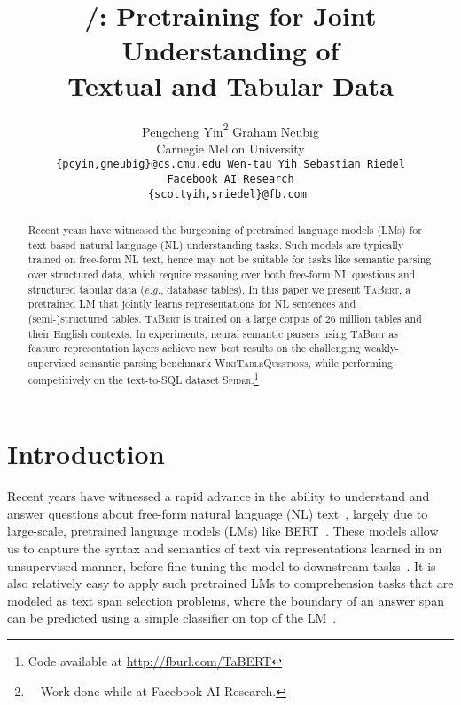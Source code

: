 \documentclass[11pt,a4paper]{article}
\title{\model/: Pretraining for Joint Understanding of \\Textual and Tabular Data}
\author{
	Pengcheng Yin\thanks{~~Work done while at Facebook AI Research.} \quad Graham Neubig \\ 
	Carnegie Mellon University \\
	\tt{\{pcyin,gneubig\}@cs.cmu.edu}
	\And Wen-tau Yih \quad Sebastian Riedel \\
	Facebook AI Research \\
	\tt{\{scottyih,sriedel\}@fb.com}
}
\date{}
\def\model/{\textsc{TaBert}}
\renewcommand{\tt}[1]{\fontfamily{cmtt}\selectfont #1}
\newcommand{\eg}{\hbox{\emph{e.g.}}\xspace}
\def\wtq/{\textsc{WikiTableQuestions}}
\def\spider/{\textsc{Spider}}
\begin{document}
\maketitle
\begin{abstract}
Recent years have witnessed the burgeoning of pretrained language models (LMs) for text-based natural language (NL) understanding tasks.
Such models are typically trained on free-form NL text, hence may not be suitable for 
tasks like semantic parsing over structured data, which require reasoning over both free-form NL questions and structured tabular data (\eg, database tables).
In this paper we present \model/, a pretrained LM that jointly learns representations for NL sentences and \mbox{(semi-)structured} tables.
\model/ is trained on a large corpus of 26 million tables and their English  contexts.
In experiments, neural semantic parsers using \model/ as feature representation layers achieve new best results on the challenging weakly-supervised semantic parsing benchmark \wtq/, while performing competitively on the text-to-SQL dataset \spider/.\footnote{Code available at \href{http://fburl.com/TaBERT}{\tt http://fburl.com/TaBERT}}

\end{abstract}

\section{Introduction}




Recent years have witnessed a rapid advance in the ability to understand and answer questions about free-form natural language (NL) text~\cite{Rajpurkar2016SQuAD10},
largely due to large-scale, pretrained language models (LMs) like BERT~\cite{Devlin2019BERTPO}.
These models allow us to capture the syntax and semantics of text via representations learned in an unsupervised manner, before fine-tuning the model to downstream tasks~\cite{melamud-etal-2016-context2vec,mccann2017learned,Peters2018DeepCW,Liu2019RoBERTaAR,Yang2019XLNetGA,Goldberg2019AssessingBS}.
It is also relatively easy to apply such pretrained LMs to comprehension tasks that are modeled as text span selection problems, where the boundary of an answer span can be predicted using a simple classifier on top of the  LM~\cite{Joshi2019SpanBERTIP}.
\end{document}
